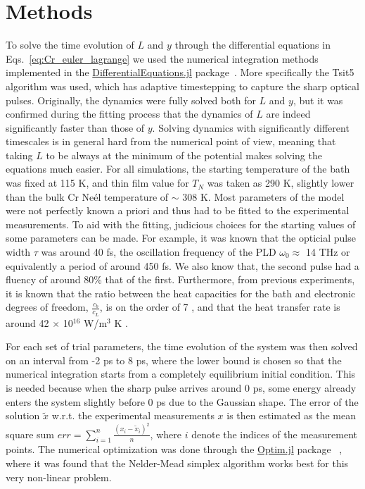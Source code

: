 \section{Methods}
To solve the time evolution of $L$ and $y$ through the differential equations in Eqs.~\ref{eq:Cr_euler_lagrange} we used the numerical integration methods implemented in the \href{https://github.com/SciML/DifferentialEquations.jl}{DifferentialEquations.jl} package~\cite{rackauckas2017differentialequations}. More specifically the Tsit5 algorithm was used, which has adaptive timestepping to capture the sharp optical pulses.
Originally, the dynamics were fully solved both for $L$ and $y$, but it was confirmed during the fitting process that the dynamics of $L$ are indeed significantly faster than those of $y$.
Solving dynamics with significantly different timescales is in general hard from the numerical point of view, meaning that taking $L$ to be always at the minimum of the potential makes solving the equations much easier.
For all simulations, the starting temperature of the bath was fixed at 115 K, and thin film value for $T_N$ was taken as 290 K, slightly lower than the bulk Cr Ne\'el temperature of $\sim$ 308 K.
Most parameters of the model were not perfectly known a priori and thus had to be fitted to the experimental measurements.
To aid with the fitting, judicious choices for the starting values of some parameters can be made.
For example, it was known that the opticial pulse width $\tau$ was around 40 fs, the oscillation frequency of the PLD $\omega_0 \approx$ 14 THz or equivalently a period of around 450 fs.
We also know that, the second pulse had a fluency of around 80\% that of the first.
Furthermore, from previous experiments, it is known that the ratio between the heat capacities for the bath and electronic degrees of freedom, $\frac{c_b}{c_L}$, is on the order of 7 \cite{Nicholson2016}, and that the heat transfer rate is around 42 $\times$ 10$^{16}$ W/m$^3$ K \cite{Hostetler1999}.

For each set of trial parameters, the time evolution of the system was then solved on an interval from -2 ps to 8 ps, where the lower bound is chosen so that the numerical integration starts from a completely equilibrium initial condition.
This is needed because when the sharp pulse arrives around 0 ps, some energy already enters the system slightly before 0 ps due to the Gaussian shape.
The error of the solution $\tilde{x}$ w.r.t. the experimental measurements $x$ is then estimated as the mean square sum $err = \sum_{i=1}^n \frac{(x_i - \tilde{x}_i)^2}{n}$, where $i$ denote the indices of the measurement points.
The numerical optimization was done through the \href{https://github.com/JuliaNLSolvers/Optim.jl}{Optim.jl} package ~\cite{mogensen2018optim}, where it was found that the Nelder-Mead simplex algorithm \cite{Nelder1965} works best for this very non-linear problem.

